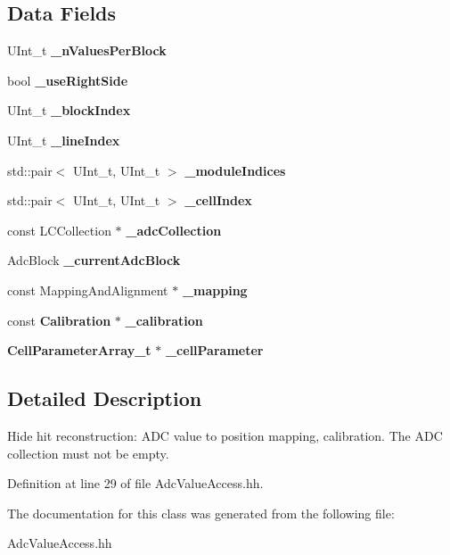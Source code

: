 \subsection*{Data Fields}
\begin{DoxyCompactItemize}
\item 
UInt\_\-t {\bfseries \_\-nValuesPerBlock}\label{classCALICE_1_1AdcValueAccess_a8f6e0844c088e95c3d473f2aa3633778}

\item 
bool {\bfseries \_\-useRightSide}\label{classCALICE_1_1AdcValueAccess_aa17c51c82cee702c234740a9037b8a62}

\item 
UInt\_\-t {\bfseries \_\-blockIndex}\label{classCALICE_1_1AdcValueAccess_a7cbe774ac91cc4fb9d4e62a5d78ab3ea}

\item 
UInt\_\-t {\bfseries \_\-lineIndex}\label{classCALICE_1_1AdcValueAccess_a5aa2c0e0e9c674df6ddc9dd038e67336}

\item 
std::pair$<$ UInt\_\-t, UInt\_\-t $>$ {\bfseries \_\-moduleIndices}\label{classCALICE_1_1AdcValueAccess_af373eb64168bf34b92cf85b7f6aba3ce}

\item 
std::pair$<$ UInt\_\-t, UInt\_\-t $>$ {\bfseries \_\-cellIndex}\label{classCALICE_1_1AdcValueAccess_a2324c0e1891d1fa418e1e1b8bb16dc6e}

\item 
const LCCollection $\ast$ {\bfseries \_\-adcCollection}\label{classCALICE_1_1AdcValueAccess_acd2fb49d0afa34c7a158baa2b64eacf8}

\item 
AdcBlock {\bfseries \_\-currentAdcBlock}\label{classCALICE_1_1AdcValueAccess_a0cd454fbfe0e49b54ee7fa7fb2640c4e}

\item 
const MappingAndAlignment $\ast$ {\bfseries \_\-mapping}\label{classCALICE_1_1AdcValueAccess_a419e13811c64297fa7551e81ab6546fb}

\item 
const {\bf Calibration} $\ast$ {\bfseries \_\-calibration}\label{classCALICE_1_1AdcValueAccess_aec81ecb16efeb7528211d61389a92308}

\item 
{\bf CellParameterArray\_\-t} $\ast$ {\bfseries \_\-cellParameter}\label{classCALICE_1_1AdcValueAccess_af589887575dfd47fc70f4db5dcd74c3a}

\end{DoxyCompactItemize}


\subsection{Detailed Description}
Hide hit reconstruction: ADC value to position mapping, calibration. The ADC collection must not be empty. 

Definition at line 29 of file AdcValueAccess.hh.

The documentation for this class was generated from the following file:\begin{DoxyCompactItemize}
\item 
AdcValueAccess.hh\end{DoxyCompactItemize}
